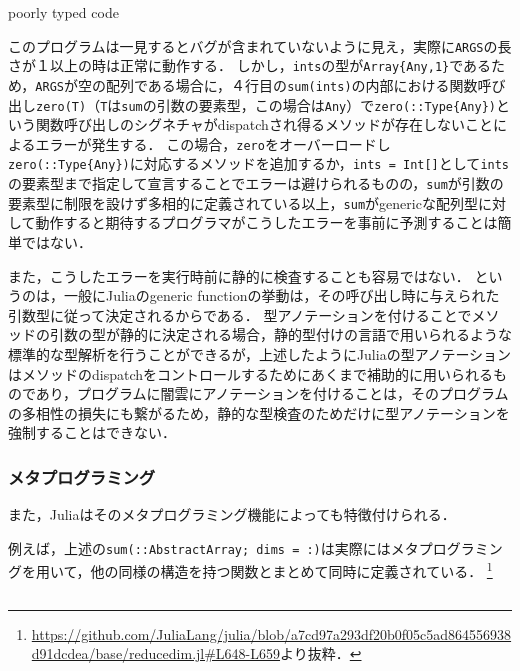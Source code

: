 \begin{listing}[ht]
  \inputminted[frame=lines]{julia}{parse_sum.jl}
  \caption{poorly typed code}
  \label{lst:target1}
\end{listing}

このプログラムは一見するとバグが含まれていないように見え，実際に\texttt{ARGS}の長さが１以上の時は正常に動作する．
しかし，\texttt{ints}の型が\texttt{Array\{Any,1\}}であるため，\texttt{ARGS}が空の配列である場合に，４行目の\texttt{sum(ints)}の内部における関数呼び出し\texttt{zero(T)}（\texttt{T}は\texttt{sum}の引数の要素型，この場合は\texttt{Any}）で\texttt{zero(::Type\{Any\})}という関数呼び出しのシグネチャがdispatchされ得るメソッドが存在しないことによるエラーが発生する．
この場合，\texttt{zero}をオーバーロードし\texttt{zero(::Type\{Any\})}に対応するメソッドを追加するか，\texttt{ints = Int[]}として\texttt{ints}の要素型まで指定して宣言することでエラーは避けられるものの，\texttt{sum}が引数の要素型に制限を設けず多相的に定義されている以上，\texttt{sum}がgenericな配列型に対して動作すると期待するプログラマがこうしたエラーを事前に予測することは簡単ではない．

また，こうしたエラーを実行時前に静的に検査することも容易ではない．
というのは，一般にJuliaのgeneric functionの挙動は，その呼び出し時に与えられた引数型に従って決定されるからである．
型アノテーションを付けることでメソッドの引数の型が静的に決定される場合，静的型付けの言語で用いられるような標準的な型解析を行うことができるが，上述したようにJuliaの型アノテーションはメソッドのdispatchをコントロールするためにあくまで補助的に用いられるものであり，プログラムに闇雲にアノテーションを付けることは，そのプログラムの多相性の損失にも繋がるため，静的な型検査のためだけに型アノテーションを強制することはできない．

\subsubsection{メタプログラミング}

また，Juliaはそのメタプログラミング機能によっても特徴付けられる．

例えば，上述の\texttt{sum(::AbstractArray; dims = :)}は実際にはメタプログラミングを用いて，他の同様の構造を持つ関数とまとめて同時に定義されている．
\footnote{
  \url{https://github.com/JuliaLang/julia/blob/a7cd97a293df20b0f05c5ad864556938d91dcdea/base/reducedim.jl\#L648-L659}より抜粋．
}

\inputminted[frame=lines, firstline=3, lastline=12, breaklines]{julia}{sums_def.jl}

